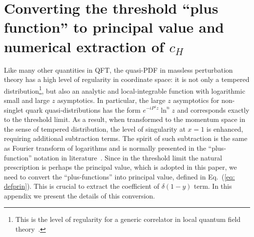 \documentclass[a4paper,11pt]{article}
\begin{document}
\section{Converting the threshold ``plus function'' to principal value and numerical extraction of $c_H$}\label{sec:convert}
Like many other quantities in QFT, the quasi-PDF in massless perturbation theory has a high level of regularity in coordinate space: it is not only a tempered distribution\footnote{This is the level of regularity for a generic correlator in local quantum field theory~\cite{Streater:1989vi}.}, but also an analytic and local-integrable function with logarithmic small and large $z$ asymptotics. In particular, the large $z$ asymptotics for non-singlet quark quasi-distributions has the form $e^{-iP^z z}\ln^n z$ and corresponds exactly to the threshold limit. As a result,  when transformed to the momentum space in the sense of tempered distribution, the level of singularity at $x=1$ is enhanced, requiring additional subtraction terms. The spirit of such subtraction is the same as Fourier transform of logarithms and is normally presented in the ``plus-function'' notation in literature~\cite{Li:2020xml}. Since in the threshold limit the natural prescription is perhaps the principal value, which is adopted in this paper, we need to convert the ``plus-functions'' into principal value, defined in Eq.~(\ref{eq: defprin}). This is crucial to extract the coefficient of $\delta(1-y)$ term. In this appendix we present the details of this conversion. 
\end{document}
